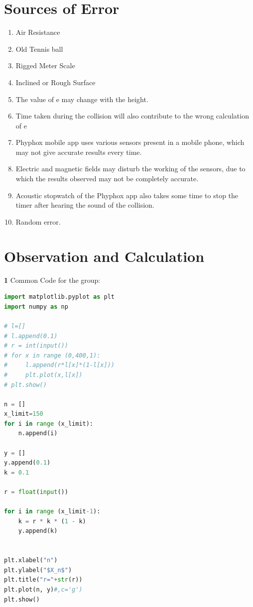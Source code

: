 \documentclass[11pt]{scrartcl} %
\begin{document}
\section{Sources of Error}
\begin{enumerate}
	\item Air Resistance
	\item Old Tennis ball
	\item Rigged Meter Scale
	\item Inclined or Rough Surface
	\item The value of e may change with the height.
	\item Time taken during the collision will also contribute to the wrong calculation of e
	\item Phyphox mobile app uses various sensors present in a mobile phone, which may not give accurate results every time.
	\item Electric and magnetic fields may disturb the working of the sensors, due to which the results observed may not be completely accurate.
	\item Acoustic stopwatch of the Phyphox app also takes some time to stop the timer after hearing the sound of the collision.
	\item Random error.
\end{enumerate}
\newpage

\section{Observation and Calculation}
\textbf{1} Common Code for the group:
\begin{lstlisting}[language=Python, caption= Q1]
import matplotlib.pyplot as plt
import numpy as np

# l=[]
# l.append(0.1)
# r = int(input())
# for x in range (0,400,1): 
#     l.append(r*l[x]*(1-l[x]))
#     plt.plot(x,l[x])
# plt.show()

n = []
x_limit=150
for i in range (x_limit):
    n.append(i)

y = []
y.append(0.1)
k = 0.1

r = float(input())

for i in range (x_limit-1):
    k = r * k * (1 - k)
    y.append(k)


plt.xlabel("n")
plt.ylabel("$X_n$")
plt.title("r="+str(r))
plt.plot(n, y)#,c='g')
plt.show() 


\end{lstlisting}
\end{document}
